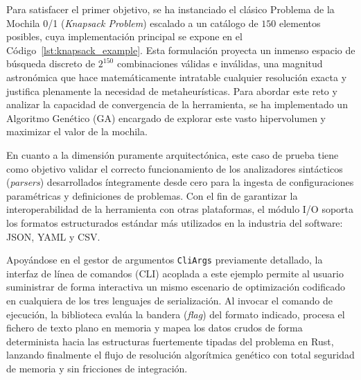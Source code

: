 \documentclass[12pt,a4paper,twoside,openright]{book}
\begin{document}
    Para satisfacer el primer objetivo, se ha instanciado el clásico Problema de la Mochila 0/1 (\textit{Knapsack Problem}) escalado a un catálogo de $150$ elementos posibles, cuya implementación principal se expone en el Código~\ref{lst:knapsack_example}. Esta formulación proyecta un inmenso espacio de búsqueda discreto de $2^{150}$ combinaciones válidas e inválidas, una magnitud astronómica que hace matemáticamente intratable cualquier resolución exacta y justifica plenamente la necesidad de metaheurísticas. Para abordar este reto y analizar la capacidad de convergencia de la herramienta, se ha implementado un Algoritmo Genético (GA) encargado de explorar este vasto hipervolumen y maximizar el valor de la mochila.

    En cuanto a la dimensión puramente arquitectónica, este caso de prueba tiene como objetivo validar el correcto funcionamiento de los analizadores sintácticos (\textit{parsers}) desarrollados íntegramente desde cero para la ingesta de configuraciones paramétricas y definiciones de problemas. Con el fin de garantizar la interoperabilidad de la herramienta con otras plataformas, el módulo I/O soporta los formatos estructurados estándar más utilizados en la industria del software: JSON, YAML y CSV. 

    Apoyándose en el gestor de argumentos \texttt{CliArgs} previamente detallado, la interfaz de línea de comandos (CLI) acoplada a este ejemplo permite al usuario suministrar de forma interactiva un mismo escenario de optimización codificado en cualquiera de los tres lenguajes de serialización. Al invocar el comando de ejecución, la biblioteca evalúa la bandera (\textit{flag}) del formato indicado, procesa el fichero de texto plano en memoria y mapea los datos crudos de forma determinista hacia las estructuras fuertemente tipadas del problema en Rust, lanzando finalmente el flujo de resolución algorítmica genético con total seguridad de memoria y sin fricciones de integración.
\end{document}
